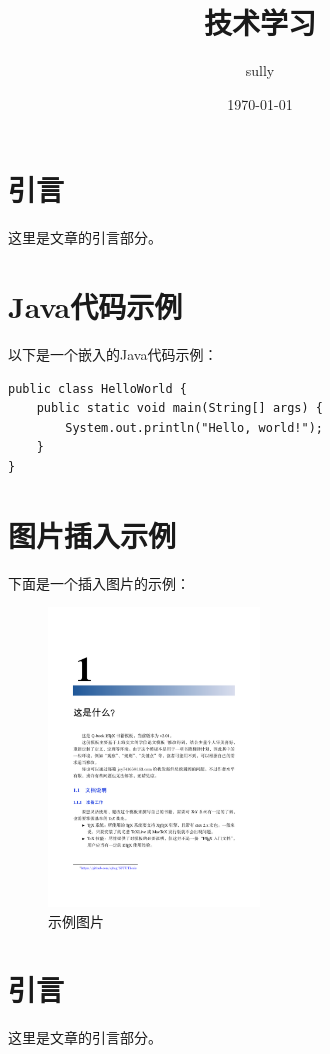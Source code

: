 \documentclass[10pt]{article}
\title{技术学习}
\author{sully}
\date{\today}
\begin{document}
\maketitle

\tableofcontents
\newpage

\section{引言}
这里是文章的引言部分。

\section{Java代码示例}
以下是一个嵌入的Java代码示例：

\begin{lstlisting}[style=java, caption={HelloWorld.java}]
public class HelloWorld {
    public static void main(String[] args) {
        System.out.println("Hello, world!");
    }
}
\end{lstlisting}

\section{图片插入示例}
下面是一个插入图片的示例：

\begin{figure}[h]
    \centering
    \includegraphics[width=0.5\textwidth]{9.png} %
    \caption{示例图片}
    \label{fig:example}
\end{figure}

\newpage
\section{引言}
这里是文章的引言部分。
\end{document}
